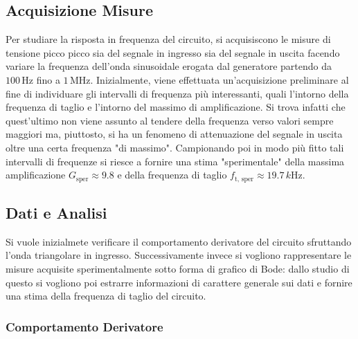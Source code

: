 \documentclass[a4paper,11pt]{article} %
\begin{document}
\subsection{Acquisizione Misure}

Per studiare la risposta in frequenza del circuito, si acquisiscono le misure di tensione picco picco sia del segnale in
ingresso sia del segnale in uscita facendo variare la frequenza dell'onda sinusoidale erogata dal generatore partendo da
$100\,\si{\Hz}$ fino a $1\,\si{\MHz}$. Inizialmente, viene effettuata un'acquisizione preliminare al fine di individuare
gli intervalli di frequenza più interessanti, quali l'intorno della frequenza di taglio e l'intorno del massimo di
amplificazione. Si trova infatti che quest'ultimo non viene assunto al tendere della frequenza verso valori sempre
maggiori ma, piuttosto, si ha un fenomeno di attenuazione del segnale in uscita oltre una certa frequenza "di massimo".
Campionando poi in modo più fitto tali intervalli di frequenze si riesce a fornire una stima "sperimentale" della massima
amplificazione $G_{\text{sper}}\approx 9.8$ e della frequenza di taglio $f_{\text{t, sper}}\approx 19.7\,\si{k\Hz}$.



\subsection{Dati e Analisi}

Si vuole inizialmete verificare il comportamento derivatore del circuito sfruttando l'onda triangolare in ingresso.
Successivamente invece si vogliono rappresentare le misure acquisite sperimentalmente sotto forma di grafico di Bode:
dallo studio di questo si vogliono poi estrarre informazioni di carattere generale sui dati e fornire una stima della
frequenza di taglio del circuito.



\subsubsection{Comportamento Derivatore}
\end{document}
